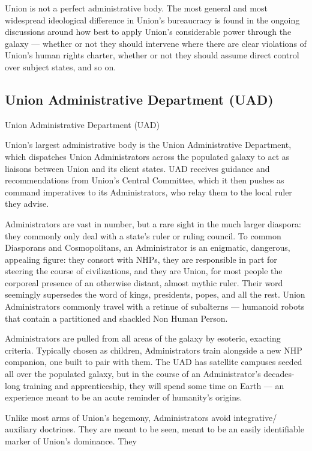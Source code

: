 Union is not a perfect administrative body. The most general and most widespread ideological  
difference in Union’s bureaucracy is found in the ongoing discussions around how best to apply  
Union’s considerable power through the galaxy — whether or not they should intervene where  
there are clear violations of Union’s human rights charter, whether or not they should assume  
direct control over subject states, and so on. 
 
 
\subsection{Union Administrative Department (UAD)}

Union Administrative Department (UAD)  

Union’s largest administrative body is the Union Administrative Department, which dispatches  
Union Administrators across the populated galaxy to act as liaisons between Union and its client  
states. UAD receives guidance and recommendations from Union’s Central Committee, which it  
then pushes as command imperatives to its Administrators, who relay them to the local ruler they  
advise. 
 

Administrators are vast in number, but a rare sight in the much larger diaspora: they commonly  
only deal with a state’s ruler or ruling council. To common Diasporans and Cosmopolitans, an  
Administrator is an enigmatic, dangerous, appealing figure: they consort with NHPs, they are  
responsible in part for steering the course of civilizations, and they are Union, for most people  
the corporeal presence of an otherwise distant, almost mythic ruler. Their word seemingly  
supersedes the word of kings, presidents, popes, and all the rest. Union Administrators  
commonly travel with a retinue of subalterns — humanoid robots that contain a partitioned and  
shackled Non Human Person. 
 

Administrators are pulled from all areas of the galaxy by esoteric, exacting criteria. Typically  
chosen as children, Administrators train alongside a new NHP companion, one built to pair with  
them. The UAD has satellite campuses seeded all over the populated galaxy, but in the course of  
an Administrator’s decades-long training and apprenticeship, they will spend some time on Earth  
— an experience meant to be an acute reminder of humanity’s origins. 
 

Unlike most arms of Union’s hegemony, Administrators avoid integrative/ auxiliary doctrines.  
They are meant to be seen, meant to be an easily identifiable marker of Union’s dominance. They  


